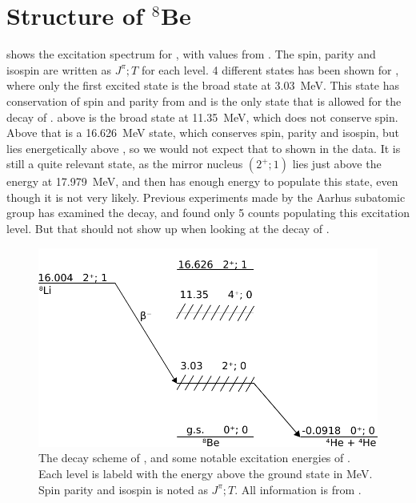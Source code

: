 \section{Structure of $^8$Be}
 shows the excitation spectrum for \ber, with values from \cite{TILLEY2004155}. The spin, parity and isospin are written as $J^\pi ; T$ for each level. 4 different states has been shown for \ber, where only the first excited state is the broad state at \SI{3.03}{MeV}. This state has conservation of spin and parity from \li and is the only state that is allowed for the decay of \li.  above is the broad state at \SI{11.35}{MeV}, which does not conserve spin. Above that is a \SI{16.626}{MeV} state, which conserves spin, parity and isospin, but lies energetically above \li, so we would not expect that to shown in the data. It is still a quite relevant state, as the mirror nucleus  $(2^+; 1)$ lies just above the energy at \SI{17.979}{MeV}, and then has enough energy to populate this state, even though it is not very likely. Previous experiments made by the Aarhus subatomic group has examined the decay, and found only 5 counts populating this excitation level. But that should not show up when looking at the decay of \li.


\begin{figure}
	\centering
	\includegraphics[width=\columnwidth]{../figures/DecayScheme.pdf}
	\caption{The decay scheme of \li, and some notable excitation energies of \ber. Each level is labeld with the energy above the \ber ground state in MeV. Spin parity and isospin is noted as $J^\pi; T$. All information is from \cite{TILLEY2004155}.}
	\label{fig:berStructure}
\end{figure}
